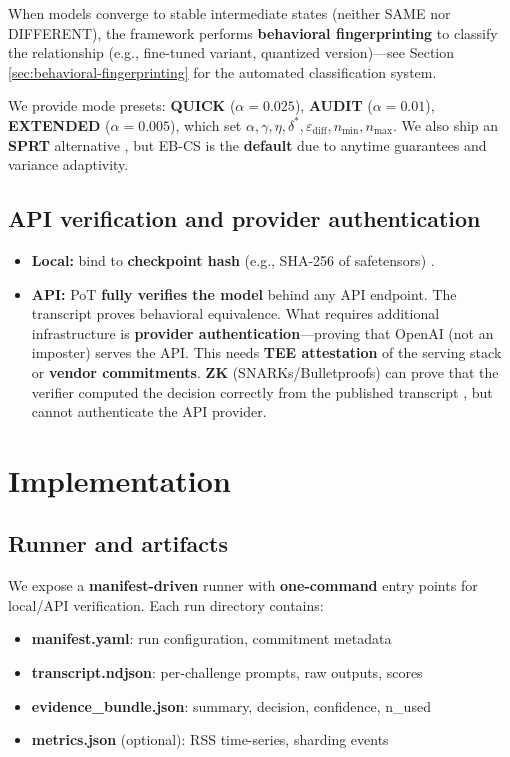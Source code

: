 \documentclass{article}
\begin{document}
When models converge to stable intermediate states (neither SAME nor DIFFERENT), the framework performs \textbf{behavioral fingerprinting} to classify the relationship (e.g., fine-tuned variant, quantized version)---see Section \ref{sec:behavioral-fingerprinting} for the automated classification system.

We provide mode presets: \textbf{QUICK} ($\alpha=0.025$), \textbf{AUDIT} ($\alpha=0.01$), \textbf{EXTENDED} ($\alpha=0.005$), which set $\alpha,\gamma,\eta,\delta^*,\varepsilon_{\text{diff}},n_{\min},n_{\max}$. We also ship an \textbf{SPRT} alternative \cite{wald1945sprt}, but EB-CS is the \textbf{default} due to anytime guarantees and variance adaptivity.

\subsection{API verification and provider authentication}
\label{sec:api-verification}

\begin{itemize}
\item \textbf{Local:} bind to \textbf{checkpoint hash} (e.g., SHA-256 of safetensors) \cite{fips180-4}.
\item \textbf{API:} PoT \textbf{fully verifies the model} behind any API endpoint. The transcript proves behavioral equivalence. What requires additional infrastructure is \textbf{provider authentication}---proving that OpenAI (not an imposter) serves the API. This needs \textbf{TEE attestation} of the serving stack or \textbf{vendor commitments}. \textbf{ZK} (SNARKs/Bulletproofs) can prove that the verifier computed the decision correctly from the published transcript \cite{bensasson2014snarks,bunz2018bulletproofs}, but cannot authenticate the API provider.
\end{itemize}

\section{Implementation}

\subsection{Runner and artifacts}

We expose a \textbf{manifest-driven} runner with \textbf{one-command} entry points for local/API verification. Each run directory contains:
\begin{itemize}
\item \textbf{manifest.yaml}: run configuration, commitment metadata
\item \textbf{transcript.ndjson}: per-challenge prompts, raw outputs, scores
\item \textbf{evidence\_bundle.json}: summary, decision, confidence, n\_used
\item \textbf{metrics.json} (optional): RSS time-series, sharding events
\end{itemize}
\end{document}
